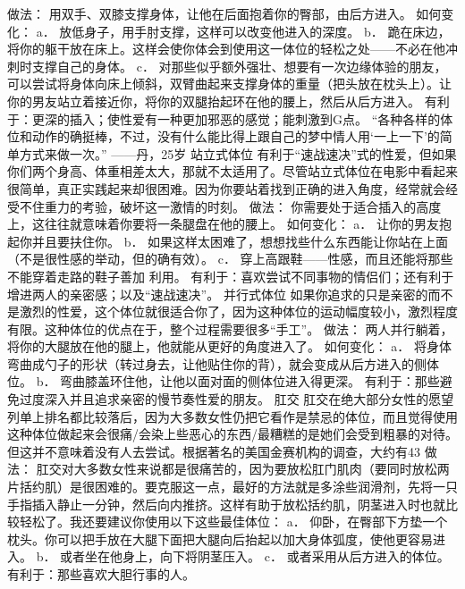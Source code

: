 \documentclass[12pt,UTF8,openany]{ctexbook}
\begin{document}
做法：
用双手、双膝支撑身体，让他在后面抱着你的臀部，由后方进入。
如何变化：
a． 放低身子，用手肘支撑，这样可以改变他进入的深度。
b． 跪在床边，将你的躯干放在床上。这样会使你体会到使用这一体位的轻松之处——不必在他冲刺时支撑自己的身体。
c． 对那些似乎额外强壮、想要有一次边缘体验的朋友，可以尝试将身体向床上倾斜，双臂曲起来支撑身体的重量（把头放在枕头上）。让你的男友站立着接近你，将你的双腿抬起环在他的腰上，然后从后方进入。
有利于：更深的插入；使性爱有一种更加邪恶的感觉；能刺激到G点。
“各种各样的体位和动作的确挺棒，不过，没有什么能比得上跟自己的梦中情人用‘一上一下’的简单方式来做一次。”
——丹，25岁
站立式体位
有利于“速战速决”式的性爱，但如果你们两个身高、体重相差太大，那就不太适用了。尽管站立式体位在电影中看起来很简单，真正实践起来却很困难。因为你要站着找到正确的进入角度，经常就会经受不住重力的考验，破坏这一激情的时刻。
做法：
你需要处于适合插入的高度上，这往往就意味着你要将一条腿盘在他的腰上。
如何变化：
a． 让你的男友抱起你并且要扶住你。
b． 如果这样太困难了，想想找些什么东西能让你站在上面（不是很性感的举动，但的确有效）。
c． 穿上高跟鞋——性感，而且还能将那些不能穿着走路的鞋子善加 利用。
有利于：喜欢尝试不同事物的情侣们；还有利于增进两人的亲密感；以及“速战速决”。
并行式体位
如果你追求的只是亲密的而不是激烈的性爱，这个体位就很适合你了，因为这种体位的运动幅度较小，激烈程度有限。这种体位的优点在于，整个过程需要很多“手工”。
做法：
两人并行躺着，将你的大腿放在他的腿上，他就能从更好的角度进入了。
如何变化：
a． 将身体弯曲成勺子的形状（转过身去，让他贴住你的背），就会变成从后方进入的侧体位。
b． 弯曲膝盖环住他，让他以面对面的侧体位进入得更深。
有利于：那些避免过度深入并且追求亲密的慢节奏性爱的朋友。
肛交
肛交在绝大部分女性的愿望列单上排名都比较落后，因为大多数女性仍把它看作是禁忌的体位，而且觉得使用这种体位做起来会很痛/会染上些恶心的东西/最糟糕的是她们会受到粗暴的对待。但这并不意味着没有人去尝试。根据著名的美国金赛机构的调查，大约有43%
做法：
肛交对大多数女性来说都是很痛苦的，因为要放松肛门肌肉（要同时放松两片括约肌）是很困难的。要克服这一点，最好的方法就是多涂些润滑剂，先将一只手指插入静止一分钟，然后向内推挤。这样有助于放松括约肌，阴茎进入时也就比较轻松了。我还要建议你使用以下这些最佳体位：
a． 仰卧，在臀部下方垫一个枕头。你可以把手放在大腿下面把大腿向后抬起以加大身体弧度，使他更容易进入。
b． 或者坐在他身上，向下将阴茎压入。
c． 或者采用从后方进入的体位。
有利于：那些喜欢大胆行事的人。
\end{document}
